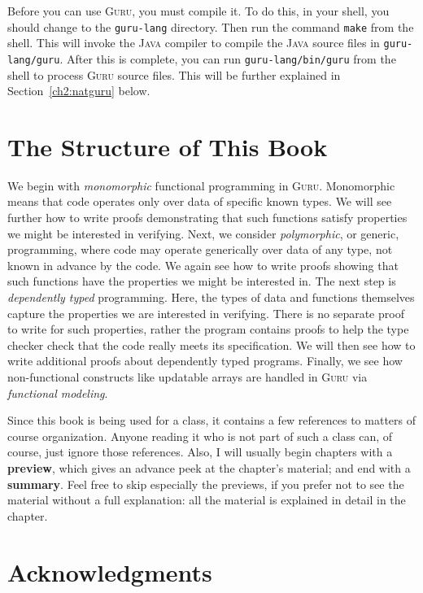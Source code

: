 \documentclass{book}[12pt]
\newcommand{\guru}[0]{\textsc{Guru}\xspace}
\begin{document}
Before you can use \guru, you must compile it.  To do this, in your
shell, you should change to the \texttt{guru-lang} directory.  Then
run the command \texttt{make} from the shell.  This will invoke the
\textsc{Java} compiler to compile the \textsc{Java} source files in
\texttt{guru-lang/guru}.  After this is complete, you can run
\texttt{guru-lang/bin/guru} from the shell to process \guru source
files.  This will be further explained in Section~\ref{ch2:natguru}
below.

\section{The Structure of This Book}

We begin with \emph{monomorphic} functional programming in \guru.
Monomorphic means that code operates only over data of specific known
types. We will see further how to write proofs demonstrating that such
functions satisfy properties we might be interested in verifying.
Next, we consider \emph{polymorphic}, or generic, programming, where
code may operate generically over data of any type, not known in
advance by the code.  We again see how to write proofs showing that
such functions have the properties we might be interested in.  The
next step is \emph{dependently typed} programming.  Here, the types of
data and functions themselves capture the properties we are interested
in verifying.  There is no separate proof to write for such
properties, rather the program contains proofs to help the type
checker check that the code really meets its specification.  We will
then see how to write additional proofs about dependently typed
programs. Finally, we see how non-functional constructs like updatable
arrays are handled in \guru via \emph{functional modeling}.

Since this book is being used for a class, it contains a few
references to matters of course organization.  Anyone reading it who
is not part of such a class can, of course, just ignore those
references.  Also, I will usually begin chapters with a
\textbf{preview}, which gives an advance peek at the chapter's
material; and end with a \textbf{summary}.  Feel free to skip
especially the previews, if you prefer not to see the material without
a full explanation: all the material is explained in detail in the
chapter.

\section{Acknowledgments}
\end{document}
